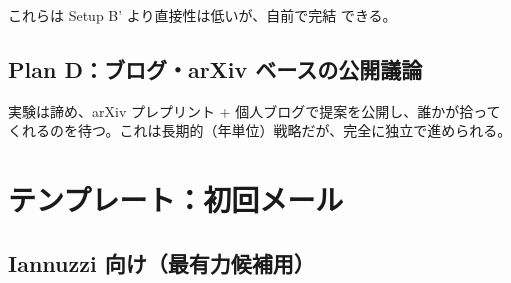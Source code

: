 \documentclass[11pt,a4paper]{article}
\def\textbf#1{#1}%
\begin{document}
これらは Setup B' より直接性は低いが、\textbf{自前で完結} できる。

\subsection{Plan D：ブログ・arXiv ベースの公開議論}

実験は諦め、arXiv プレプリント + 個人ブログで提案を公開し、誰かが拾って
くれるのを待つ。これは長期的（年単位）戦略だが、完全に独立で進められる。

\newpage

\section{テンプレート：初回メール}

\subsection{Iannuzzi 向け（最有力候補用）}
\end{document}
